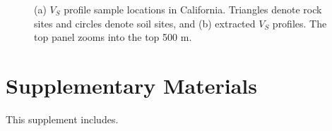 \clearpage
{}
\begin{figure}[!ht]
     \hfil
    \caption{ (a) $V_S$ profile sample locations in California. Triangles denote rock sites and circles denote soil sites, and (b) extracted $V_S$ profiles. The top panel zooms into the top 500 m. }
    \label{fig:eks-14}
\end{figure}
\clearpage

\setcounter{table}{0}
\setcounter{figure}{0}
\renewcommand{\thetable}{S\arabic{chapter}.\arabic{table}}
\renewcommand{\thefigure}{S\arabic{chapter}.\arabic{figure}}
\newpage
\section*{Supplementary Materials}

This supplement includes.




\renewcommand{\thetable}{\arabic{table}}
\renewcommand{\thefigure}{\arabic{figure}}


